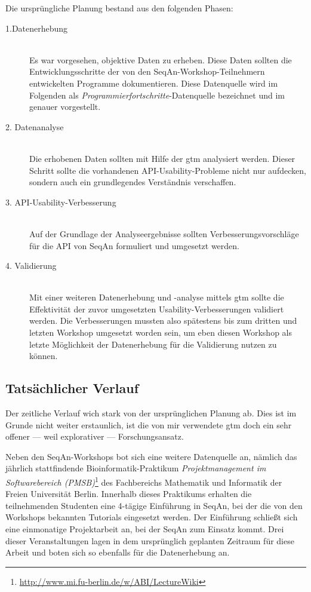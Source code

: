 Die ursprüngliche Planung bestand aus den folgenden Phasen:

\begin{description}
  \item[1.Datenerhebung] \hfill \\
  Es war vorgesehen, objektive Daten zu erheben. Diese Daten sollten die Entwicklungsschritte der von den SeqAn-Workshop-Teilnehmern entwickelten Programme dokumentieren. Diese Datenquelle wird im Folgenden als \textit{Programmierfortschritte}-Datenquelle bezeichnet und im  genauer vorgestellt.
  \item[2. Datenanalyse] \hfill \\
  Die erhobenen Daten sollten mit Hilfe der \gls{gtm} analysiert werden. Dieser Schritt sollte die vorhandenen API-Usability-Probleme nicht nur aufdecken, sondern auch ein grundlegendes Verständnis verschaffen.
  \item[3. API-Usability-Verbesserung] \hfill \\
  Auf der Grundlage der Analyseergebnisse sollten Verbesserungsvorschläge für die API von SeqAn formuliert und umgesetzt werden.
  \item[4. Validierung] \hfill \\
  Mit einer weiteren Datenerhebung und -analyse mittels \gls{gtm} sollte die Effektivität der zuvor umgesetzten Usability-Verbesserungen validiert werden. Die Verbesserungen mussten also spätestens bis zum dritten und letzten Workshop umgesetzt worden sein, um eben diesen Workshop als letzte Möglichkeit der Datenerhebung für die Validierung nutzen zu können.
\end{description}



\subsection{Tatsächlicher Verlauf}
\label{sec:verlauf}

Der zeitliche Verlauf wich stark von der ursprünglichen Planung ab. Dies ist im Grunde nicht weiter erstaunlich, ist die von mir verwendete \gls{gtm} doch ein sehr offener --- weil explorativer --- Forschungsansatz.

\label{sec:data-sources-pmsb}
Neben den SeqAn-Workshops bot sich eine weitere Datenquelle an, nämlich das jährlich stattfindende Bioinformatik-Praktikum \textit{Projektmanagement im Softwarebereich (PMSB)}\footnote{\url{http://www.mi.fu-berlin.de/w/ABI/LectureWiki}} des Fachbereichs Mathematik und Informatik der Freien Universität Berlin. Innerhalb dieses Praktikums erhalten die teilnehmenden Studenten eine 4-tägige Einführung in SeqAn, bei der die von den Workshops bekannten Tutorials eingesetzt werden. Der Einführung schließt sich eine einmonatige Projektarbeit an, bei der SeqAn zum Einsatz kommt. Drei dieser Veranstaltungen lagen in dem ursprünglich geplanten Zeitraum für diese Arbeit und boten sich so ebenfalls für die Datenerhebung an.

